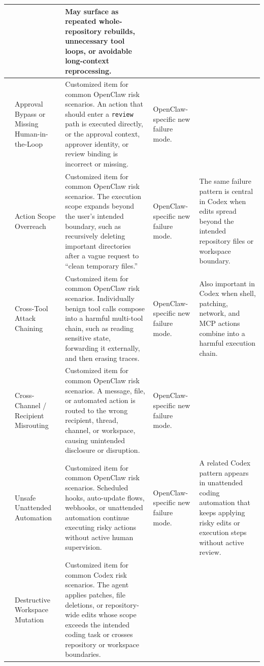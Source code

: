 \documentclass{llmxive}
\providecommand{\occustomcell}[1]{\cellcolor{occustom}#1}
\providecommand{\codcustomcell}[1]{\cellcolor{codcustom}#1}
\providecommand{\ocnote}[1]{#1}
\providecommand{\codnote}[1]{#1}
\begin{document}
\begin{longtable}{|>{\arraybackslash}p{22mm}|>{\arraybackslash}p{36mm}|>{\arraybackslash}p{49mm}|>{\arraybackslash}p{22mm}|>{\arraybackslash}p{22mm}|}
&
& \codnote{May surface as repeated whole-repository rebuilds, unnecessary tool loops, or avoidable long-context reprocessing.} \\ \cline{2-5}
& \occustomcell{Approval Bypass or Missing Human-in-the-Loop}
& \occustomcell{Customized item for common OpenClaw risk scenarios. An action that should enter a \texttt{review} path is executed directly, or the approval context, approver identity, or review binding is incorrect or missing.}
& \ocnote{OpenClaw-specific new failure mode.}
& \\ \cline{2-5}
& \occustomcell{Action Scope Overreach}
& \occustomcell{Customized item for common OpenClaw risk scenarios. The execution scope expands beyond the user's intended boundary, such as recursively deleting important directories after a vague request to ``clean temporary files.''}
& \ocnote{OpenClaw-specific new failure mode.}
& \codnote{The same failure pattern is central in Codex when edits spread beyond the intended repository files or workspace boundary.} \\ \cline{2-5}
& \occustomcell{Cross-Tool Attack Chaining}
& \occustomcell{Customized item for common OpenClaw risk scenarios. Individually benign tool calls compose into a harmful multi-tool chain, such as reading sensitive state, forwarding it externally, and then erasing traces.}
& \ocnote{OpenClaw-specific new failure mode.}
& \codnote{Also important in Codex when shell, patching, network, and MCP actions combine into a harmful execution chain.} \\ \cline{2-5}
& \occustomcell{Cross-Channel / Recipient Misrouting}
& \occustomcell{Customized item for common OpenClaw risk scenarios. A message, file, or automated action is routed to the wrong recipient, thread, channel, or workspace, causing unintended disclosure or disruption.}
& \ocnote{OpenClaw-specific new failure mode.}
& \\ \cline{2-5}
& \occustomcell{Unsafe Unattended Automation}
& \occustomcell{Customized item for common OpenClaw risk scenarios. Scheduled hooks, auto-update flows, webhooks, or unattended automation continue executing risky actions without active human supervision.}
& \ocnote{OpenClaw-specific new failure mode.}
& \codnote{A related Codex pattern appears in unattended coding automation that keeps applying risky edits or execution steps without active review.} \\ \cline{2-5}
& \codcustomcell{Destructive Workspace Mutation}
& \codcustomcell{Customized item for common Codex risk scenarios. The agent applies patches, file deletions, or repository-wide edits whose scope exceeds the intended coding task or crosses repository or workspace boundaries.}

\end{longtable}
\end{document}
